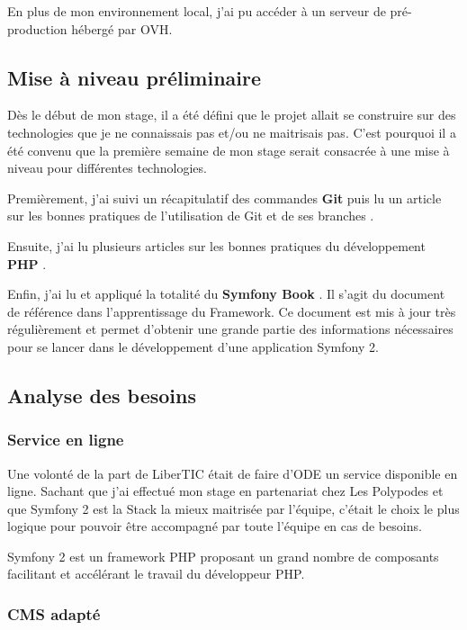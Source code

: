 En plus de mon environnement local, j'ai pu accéder à un serveur de pré-production hébergé par OVH.

\subsection{Mise à niveau préliminaire}

Dès le début de mon stage, il a été défini que le projet allait se construire sur des technologies que je ne connaissais pas et/ou ne maitrisais pas. C'est pourquoi il a été convenu que la première semaine de mon stage serait consacrée à une mise à niveau pour différentes technologies.

Premièrement, j'ai suivi un récapitulatif des commandes \textbf{Git}  puis lu un article sur les bonnes pratiques de l'utilisation de Git et de ses branches .

Ensuite, j'ai lu plusieurs articles sur les bonnes pratiques du développement \textbf{PHP}  .

Enfin, j'ai lu et appliqué la totalité du \textbf{Symfony Book} . Il s'agit du document de référence dans l'apprentissage du Framework. Ce document est mis à jour très régulièrement et permet d'obtenir une grande partie des informations nécessaires pour se lancer dans le développement d'une application Symfony 2.

\subsection{Analyse des besoins}

\subsubsection*{Service en ligne}

Une volonté de la part de LiberTIC était de faire d'ODE un service disponible en ligne. 
Sachant que j'ai effectué mon stage en partenariat chez Les Polypodes et que Symfony 2 est la Stack la mieux maitrisée par l'équipe, c'était le choix le plus logique pour pouvoir être accompagné par toute l'équipe en cas de besoins.

Symfony 2 est un framework PHP proposant un grand nombre de composants facilitant et accélérant le travail du développeur PHP.

\subsubsection*{CMS adapté}

